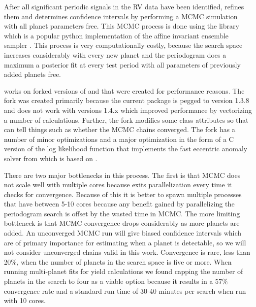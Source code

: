 After all significant periodic signals in the RV data have been identified,
 refines them and determines confidence intervals by performing
a MCMC simulation with all planet parameters free. This MCMC process is done
using the  library \citep{emcee} which is a popular python
implementation of the affine invariant ensemble sampler \citep{Goodman2010}.
This process is very computationally costly, because the search space increases
considerably with every new planet and the periodogram does a maximum a
posterior fit at every test period with all parameters of previously added
planets free.

 works on forked versions of  and  that were created
for performance reasons. The  fork was created primarily because the
current  package is pegged to  version 1.3.8 and does not work
with  versions 1.4.x which improved performance by vectorizing a number
of calculations. Further, the fork modifies some class attributes so that
 can tell things such as whether the MCMC chains converged. The
 fork has a number of minor optimizations and a major optimization in the
form of a C version of the log likelihood function that implements the fast
eccentric anomaly solver from  \citep{brandtOrvaraEfficient2021} which is
based on \citet{raposo-pulidoEfficientCode2017}. 

There are two major bottlenecks in this process. The first is that MCMC does
not scale well with multiple cores because  exits parallelization
every time it checks for convergence. Because of this it is better to spawn
multiple processes that have between 5-10 cores because any benefit gained by
parallelizing the periodogram search is offset by the wasted time in MCMC. The
more limiting bottleneck is that MCMC convergence drops considerably as more
planets are added. An unconverged MCMC run will give biased confidence
intervals which are of primary importance for estimating when a planet is
detectable, so we will not consider unconverged chains valid in this work.
Convergence is rare, less than 20\%, when the number of planets in the search
space is five or more. When running multi-planet fits for yield calculations we
found capping the number of planets in the search to four as a viable option
because it results in a 57\% convergence rate and a standard run time of 30-40
minutes per search when run with 10 cores.


